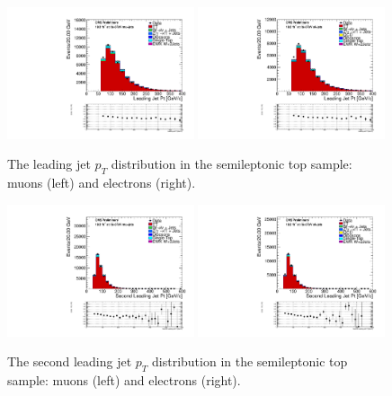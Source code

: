 \begin{figure}[htb] 
  {\centering
    \includegraphics[width=0.49\textwidth]{figs/topwjes/mu_EWK_W_2jets_tagjet1_pt_TTbarControlPlots_EWKW2jets.pdf}
    \includegraphics[width=0.49\textwidth]{figs/topwjes/el_EWK_W_2jets_tagjet1_pt_TTbarControlPlots_met_30_WmT_30_EWKW2jets.pdf}
    \caption{The leading jet $p_{T}$ distribution in the semileptonic top sample: muons (left) and electrons (right).}
    \label{fig:topw:jet1pt}}
\end{figure}
\begin{figure}[htb] 
  {\centering
    \includegraphics[width=0.49\textwidth]{figs/topwjes/mu_EWK_W_2jets_tagjet2_pt_TTbarControlPlots_EWKW2jets.pdf}
    \includegraphics[width=0.49\textwidth]{figs/topwjes/el_EWK_W_2jets_tagjet2_pt_TTbarControlPlots_met_30_WmT_30_EWKW2jets.pdf}
    \caption{The second leading jet $p_{T}$ distribution in the semileptonic top sample: muons (left) and electrons (right).}
    \label{fig:topw:jet2pt}}
\end{figure}
